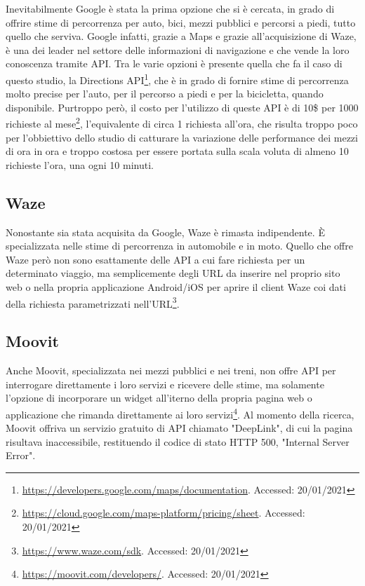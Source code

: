 Inevitabilmente Google è stata la prima opzione che si è cercata, in grado di offrire stime di percorrenza per auto, bici, mezzi pubblici e percorsi a piedi, tutto quello che serviva. Google infatti, grazie a Maps e grazie all'acquisizione di Waze, è una dei leader nel settore delle informazioni di navigazione e che vende la loro conoscenza tramite API. Tra le varie opzioni è presente quella che fa il caso di questo studio, la Directions API\footnote{\url{https://developers.google.com/maps/documentation}. Accessed: 20/01/2021}, che è in grado di fornire stime di percorrenza molto precise per l'auto, per il percorso a piedi e per la bicicletta, quando disponibile. Purtroppo però, il costo per l'utilizzo di queste API è di 10\$ per 1000 richieste al mese\footnote{\url{https://cloud.google.com/maps-platform/pricing/sheet}. Accessed: 20/01/2021}, l'equivalente di circa 1 richiesta all'ora, che risulta troppo poco per l'obbiettivo dello studio di catturare la variazione delle performance dei mezzi di ora in ora e troppo costosa per essere portata sulla scala voluta di almeno 10 richieste l'ora, una ogni 10 minuti.

\subsection{Waze}

Nonostante sia stata acquisita da Google, Waze è rimasta indipendente. È specializzata nelle stime di percorrenza in automobile e in moto. Quello che offre Waze però non sono esattamente delle API a cui fare richiesta per un determinato viaggio, ma semplicemente degli URL da inserire nel proprio sito web o nella propria applicazione Android/iOS per aprire il client Waze coi dati della richiesta parametrizzati nell'URL\footnote{\url{https://www.waze.com/sdk}. Accessed: 20/01/2021}.

\subsection{Moovit}

Anche Moovit, specializzata nei mezzi pubblici e nei treni, non offre API per interrogare direttamente i loro servizi e ricevere delle stime, ma solamente l'opzione di incorporare un widget all'iterno della propria pagina web o applicazione che rimanda direttamente ai loro servizi\footnote{\url{https://moovit.com/developers/}. Accessed: 20/01/2021}. Al momento della ricerca, Moovit offriva un servizio gratuito di API chiamato "DeepLink", di cui la pagina risultava inaccessibile, restituendo il codice di stato HTTP 500, "Internal Server Error".

